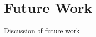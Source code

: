 \documentclass[main.tex]{subfiles}
\begin{document}
\section{Future Work}
Discussion of future work
\end{document}
